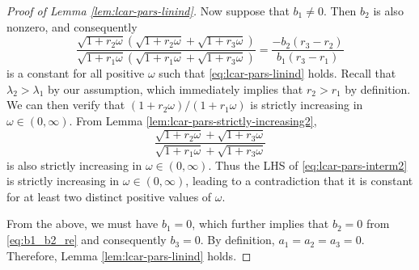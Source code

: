 \documentclass[11pt]{article}
\theoremstyle{definition}
\theoremstyle{remark}
\begin{document}
\begin{proof}[Proof of Lemma \ref{lem:lcar-pars-linind}]
Now suppose that $b_1\neq 0$. Then $b_2$ is also nonzero, and consequently  
\begin{equation}\label{eq:lcar-pars-interm2}
\frac{\sqrt{1+r_2\omega}(\sqrt{1+r_2\omega}+\sqrt{1+r_3\omega})}{\sqrt{1+r_1\omega}(\sqrt{1+r_1\omega}+\sqrt{1+r_3\omega})} = \frac{-b_2(r_3-r_2)}{b_1(r_3-r_1)}
\end{equation} is a constant for all positive $\omega$ such that \eqref{eq:lcar-pars-linind}  holds. Recall that $\lambda_2>\lambda_1$ by our assumption, which immediately implies that $r_2 > r_1$ by definition. We can then verify that  $(1+r_2\omega)/(1+r_1\omega)$ is strictly increasing in  $\omega \in (0, \infty)$.
From Lemma \ref{lem:lcar-pars-strictly-increasing2}, 
\[ \frac{\sqrt{1+r_2\omega} + \sqrt{1+r_3\omega}}{\sqrt{1+r_1\omega} + \sqrt{1+r_3\omega}} \]
is also strictly increasing in $\omega\in (0,\infty)$. Thus the LHS of \eqref{eq:lcar-pars-interm2} is strictly increasing in $\omega\in(0,\infty)$, leading to a contradiction that it is constant for at least two distinct positive values of $\omega$. 

From the above, we must have $b_1=0$, which further implies that $b_2 = 0$ from \eqref{eq:b1_b2_re} and consequently $b_3=0$. By definition,  $a_1=a_2=a_3=0$. Therefore, Lemma \ref{lem:lcar-pars-linind} holds. 
\end{proof}
\end{document}
